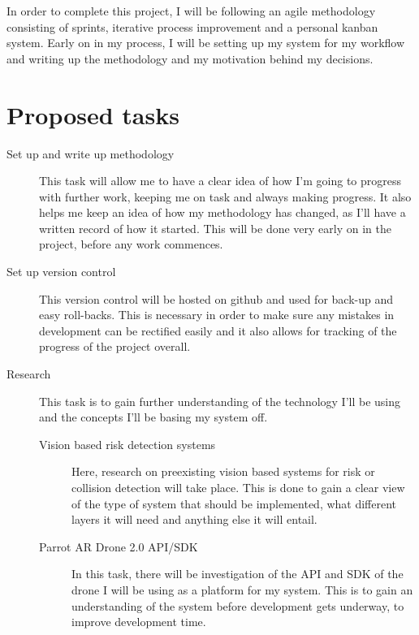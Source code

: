 \documentclass[11pt,fleqn,twoside]{article}
\begin{document}
In order to complete this project, I will be following an agile methodology consisting of sprints, iterative process improvement and a personal kanban system\cite{PersonalKanban}. Early on in my process, I will be setting up my system for my workflow and writing up the methodology and my motivation behind my decisions.
\section{Proposed tasks}
\begin{description}
  \item[Set up and write up methodology]
    This task will allow me to have a clear idea of how I'm going to progress with further work, keeping me on task and always making progress. It also helps me keep an idea of how my methodology has changed, as I'll have a written record of how it started. This will be done very early on in the project, before any work commences.
  \item[Set up version control]
    This version control will be hosted on github and used for back-up and easy roll-backs. This is necessary in order to make sure any mistakes in development can be rectified easily and it also allows for tracking of the progress of the project overall.
  \item[Research]
  This task is to gain further understanding of the technology I'll be using and the concepts I'll be basing my system off.
    \begin{description}
      \item[Vision based risk detection systems]
        Here, research on preexisting vision based systems for risk or collision detection will take place. This is done to gain a clear view of the type of system that should be implemented, what different layers it will need and anything else it will entail.
      \item[Parrot AR Drone 2.0 API/SDK]
        In this task, there will be investigation of the API and SDK of the drone I will be using as a platform for my system. This is to gain an understanding of the system before development gets underway, to improve development time. 
    \end{description}
\end{description}

\end{document}
